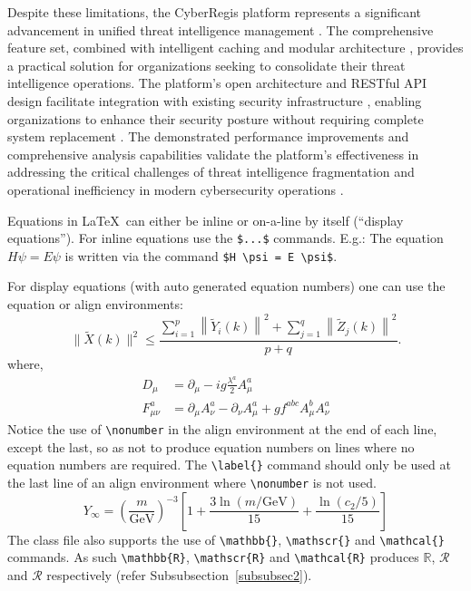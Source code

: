 \documentclass[pdflatex,sn-mathphys-num]{sn-jnl}%
\theoremstyle{thmstyleone}%
\theoremstyle{thmstyletwo}%
\theoremstyle{thmstylethree}%
\begin{document}
Despite these limitations, the CyberRegis platform represents a significant advancement in unified threat intelligence management \cite{bib1}. The comprehensive feature set, combined with intelligent caching and modular architecture \cite{bib19,bib20}, provides a practical solution for organizations seeking to consolidate their threat intelligence operations. The platform's open architecture and RESTful API design facilitate integration with existing security infrastructure \cite{bib7}, enabling organizations to enhance their security posture without requiring complete system replacement \cite{bib9}. The demonstrated performance improvements and comprehensive analysis capabilities validate the platform's effectiveness in addressing the critical challenges of threat intelligence fragmentation and operational inefficiency in modern cybersecurity operations \cite{bib1,bib2}.

Equations in \LaTeX\ can either be inline or on-a-line by itself (``display equations''). For
inline equations use the \verb+$...$+ commands. E.g.: The equation
$H\psi = E \psi$ is written via the command \verb+$H \psi = E \psi$+.

For display equations (with auto generated equation numbers)
one can use the equation or align environments:
\begin{equation}
\|\tilde{X}(k)\|^2 \leq\frac{\sum\limits_{i=1}^{p}\left\|\tilde{Y}_i(k)\right\|^2+\sum\limits_{j=1}^{q}\left\|\tilde{Z}_j(k)\right\|^2 }{p+q}.\label{eq1}
\end{equation}
where,
\begin{align}
D_\mu &=  \partial_\mu - ig \frac{\lambda^a}{2} A^a_\mu \nonumber \\
F^a_{\mu\nu} &= \partial_\mu A^a_\nu - \partial_\nu A^a_\mu + g f^{abc} A^b_\mu A^a_\nu \label{eq2}
\end{align}
Notice the use of \verb+\nonumber+ in the align environment at the end
of each line, except the last, so as not to produce equation numbers on
lines where no equation numbers are required. The \verb+\label{}+ command
should only be used at the last line of an align environment where
\verb+\nonumber+ is not used.
\begin{equation}
Y_\infty = \left( \frac{m}{\textrm{GeV}} \right)^{-3}
    \left[ 1 + \frac{3 \ln(m/\textrm{GeV})}{15}
    + \frac{\ln(c_2/5)}{15} \right]
\end{equation}
The class file also supports the use of \verb+\mathbb{}+, \verb+\mathscr{}+ and
\verb+\mathcal{}+ commands. As such \verb+\mathbb{R}+, \verb+\mathscr{R}+
and \verb+\mathcal{R}+ produces $\mathbb{R}$, $\mathscr{R}$ and $\mathcal{R}$
respectively (refer Subsubsection~\ref{subsubsec2}).
\end{document}
